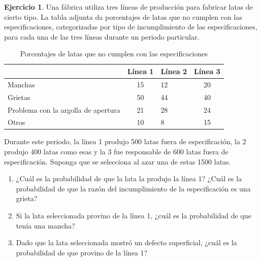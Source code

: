 \documentclass[
  11pt,
]{book}
\theoremstyle{definition}
\theoremstyle{definition}
\theoremstyle{definition}
\newtheorem{exercise}{Ejercicio}[chapter]
\theoremstyle{definition}
\theoremstyle{remark}
\begin{document}
\begin{exercise}

Una fábrica utiliza tres líneas de producción para fabricar latas de cierto tipo. La tabla adjunta da porcentajes de latas que no cumplen con las especificaciones, categorizadas por tipo de incumplimiento de las especificaciones, para cada una de las tres líneas durante un periodo particular.

\begin{table}[H]
\centering
\caption{\label{tab:unnamed-chunk-25}Porcentajes de latas que no cumplen con las especificaciones}
\centering
\begin{tabular}[t]{>{\raggedright\arraybackslash}p{5cm}clc}
\toprule
\textbf{} & \textbf{Línea 1} & \textbf{Línea 2} & \textbf{Línea 3}\\
\midrule
Manchas & 15 & 12 & 20\\
Grietas & 50 & 44 & 40\\
Problema con la argolla de apertura & 21 & 28 & 24\\
Otros & 10 & 8 & 15\\
\bottomrule
\end{tabular}
\end{table}

Durante este periodo, la línea 1 produjo 500 latas fuera de especificación, la 2 produjo 400 latas como esas y la 3 fue responsable de 600 latas fuera de especificación. Suponga que se selecciona al azar una de estas 1500 latas.

\begin{enumerate}
\def\labelenumi{\alph{enumi}.}
\item
  ¿Cuál es la probabilidad de que la lata la produjo la línea 1? ¿Cuál es la probabilidad de que la razón del incumplimiento de la especificación es una grieta?
\item
  Si la lata seleccionada provino de la línea 1, ¿cuál es la probabilidad de que tenía una mancha?
\item
  Dado que la lata seleccionada mostró un defecto superficial, ¿cuál es la probabilidad de que provino de la línea 1?\\
\end{enumerate}

\end{exercise}
\end{document}
